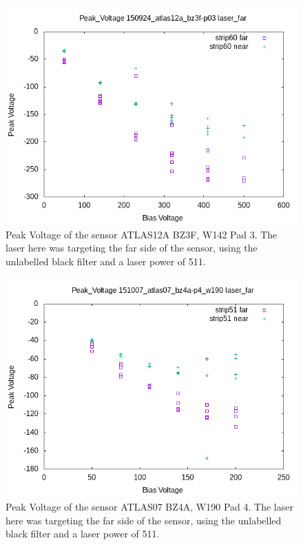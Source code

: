 \documentclass{report}
\begin{document}
            \begin{figure}[h] 
                \includegraphics[height=.4\textheight]{Peak_Voltage__150924_atlas12a_bz3f-p03__laser_far}
                \centering
                \caption{ Peak Voltage of the sensor ATLAS12A BZ3F, W142 Pad 3. The laser here was targeting the far side of the sensor, using the unlabelled black filter and a laser power of 511. }
                \label{fig:Peak_Voltage__150924_atlas12a_bz3f-p03__laser_far}
            \end{figure}

            \begin{figure}[h] 
                \includegraphics[height=.4\textheight]{Peak_Voltage__151007_atlas07_bz4a-p4_w190__laser_far}
                \centering
                \caption{ Peak Voltage of the sensor ATLAS07 BZ4A, W190 Pad 4. The laser here was targeting the far side of the sensor, using the unlabelled black filter and a laser power of 511. }
                \label{fig:Peak_Voltage__151007_atlas07_bz4a-p4_w190__laser_far}
            \end{figure}
\end{document}
